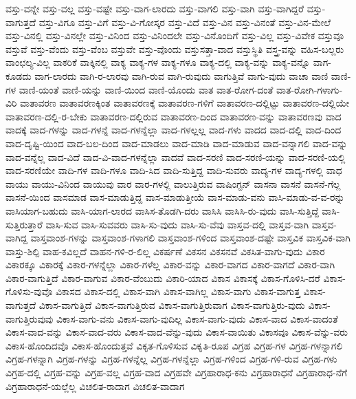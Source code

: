 {ವಸ್ತು-ವನ್ನೇ
ವಸ್ತು-ವಲ್ಲ
ವಸ್ತು-ವಷ್ಟೇ
ವಸ್ತು-ವಾಗ-ಲಾರದು
ವಸ್ತು-ವಾಗಲಿ
ವಸ್ತು-ವಾಗಿ
ವಸ್ತು-ವಾಗಿದ್ದರೆ
ವಸ್ತು-ವಾಗುತ್ತದೆ
ವಸ್ತು-ವಿಗೂ
ವಸ್ತು-ವಿಗೆ
ವಸ್ತು-ವಿ-ಗೋಸ್ಕರ
ವಸ್ತು-ವಿದೆ
ವಸ್ತು-ವಿನ
ವಸ್ತು-ವಿನಂತೆ
ವಸ್ತು-ವಿನ-ಮೇಲೆ
ವಸ್ತು-ವಿನಲ್ಲಿ
ವಸ್ತು-ವಿನಲ್ಲೇ
ವಸ್ತು-ವಿನಿಂದ
ವಸ್ತು-ವಿನಿಂದಲೇ
ವಸ್ತು-ವಿನೊಂದಿಗೆ
ವಸ್ತು-ವಿಲ್ಲ
ವಸ್ತು-ವಿವೇಕ
ವಸ್ತುವೂ
ವಸ್ತುವೆ
ವಸ್ತು-ವೆಂದು
ವಸ್ತು-ವೆಂಬ
ವಸ್ತುವೇ
ವಸ್ತು-ವೊಂದು
ವಸ್ತುಸತ್ತಾ-ವಾದ
ವಸ್ತುಸ್ಥಿತಿ
ವಸ್ತ್ರ-ವನ್ನು
ವಹಿಸ-ಬಲ್ಲರು
ವಾಂಛಲ್ಯ-ವಿಲ್ಲ
ವಾಕರಿಕೆ
ವಾಕ್ಕಿನಲ್ಲಿ
ವಾಕ್ಯ
ವಾಕ್ಯ-ಗಳ
ವಾಕ್ಯ-ಗಳೂ
ವಾಕ್ಯ-ದಲ್ಲಿ
ವಾಕ್ಯ-ವನ್ನು
ವಾಕ್ಯ-ವನ್ನೊ
ವಾಗ-ಕೂಡದು
ವಾಗ-ಲಾರದು
ವಾಗಿ-ರ-ಲಾರವು
ವಾಗಿ-ರುವ
ವಾಗಿ-ರುವುದು
ವಾಗುತ್ತಿವೆ
ವಾಗು-ವುದು
ವಾಚಾ
ವಾಣಿ
ವಾಣಿ-ಗಳ
ವಾಣಿ-ಯಂತೆ
ವಾಣಿ-ಯನ್ನು
ವಾಣಿ-ಯಿಂದ
ವಾಣಿ-ಯೊಂದು
ವಾತ
ವಾತ-ರೋಗ-ದಂತೆ
ವಾತ-ರೋಗಿ-ಗಳಾಗು-ವಿರಿ
ವಾತಾವರಣ
ವಾತಾವರಣಕ್ಕಿಂತ
ವಾತಾವರಣಕ್ಕೆ
ವಾತಾವರಣ-ಗಳಿಗೆ
ವಾತಾವರಣ-ದಲ್ಲಿಟ್ಟು
ವಾತಾವರಣ-ದಲ್ಲಿಯೇ
ವಾತಾವರಣ-ದಲ್ಲಿ-ರ-ಬೇಕು
ವಾತಾವರಣ-ದಲ್ಲಿರುವ
ವಾತಾವರಣ-ದಿಂದ
ವಾತಾವರಣ-ವನ್ನು
ವಾತಾವರಣವು
ವಾದ
ವಾದಕ್ಕೆ
ವಾದ-ಗಳನ್ನು
ವಾದ-ಗಳನ್ನೆ
ವಾದ-ಗಳನ್ನೆಲ್ಲಾ
ವಾದ-ಗಳಲ್ಲಲ್ಲ
ವಾದ-ಗಳು
ವಾದದ
ವಾದ-ದಲ್ಲಿ
ವಾದ-ದಿಂದ
ವಾದ-ದೃಷ್ಟಿ-ಯಿಂದ
ವಾದ-ಬಲ-ದಿಂದ
ವಾದ-ಮಾಡಲು
ವಾದ-ಮಾಡಿ
ವಾದ-ಮಾಡುವ
ವಾದ-ವನ್ನಾಗಲಿ
ವಾದ-ವನ್ನು
ವಾದ-ವನ್ನೆಲ್ಲ
ವಾದ-ವಿದೆ
ವಾದ-ವಿ-ವಾದ-ಗಳನ್ನೆಲ್ಲಾ
ವಾದವೆ
ವಾದ-ಸರಣಿ
ವಾದ-ಸರಣಿ-ಯನ್ನು
ವಾದ-ಸರಣಿ-ಯಲ್ಲಿ
ವಾದ-ಸರಣಿಯೇ
ವಾದಿ-ಗಳ
ವಾದಿ-ಗಳೂ
ವಾದಿ-ಸಿದ
ವಾದಿ-ಸುತ್ತಿದ್ದ
ವಾದಿ-ಸುವರು
ವಾದ್ಯ-ಗಳ
ವಾದ್ಯ-ಗಳಲ್ಲಿ
ವಾಧ
ವಾಯು
ವಾಯು-ವಿನಿಂದ
ವಾಯುವು
ವಾರ
ವಾರ-ಗಳಲ್ಲಿ
ವಾಲುತ್ತಿರುವ
ವಾಷಿಂಗ್ಟನ್
ವಾಸನಾ
ವಾಸನೆ
ವಾಸನೆ-ಗೆಲ್ಲ
ವಾಸನೆ-ಯಿಂದ
ವಾಸಮಾಡ
ವಾಸ-ಮಾಡುತ್ತಿದ್ದ
ವಾಸ-ಮಾಡುತ್ತೀಯೆ
ವಾಸ-ಮಾಡು-ವನು
ವಾಸಿ-ಮಾಡು-ವ-ವ-ರನ್ನು
ವಾಸಿಯಾಗ-ಬಹುದು
ವಾಸಿ-ಯಾಗ-ಲಾರದ
ವಾಸಿಸ-ತೊಡಗಿ-ದರು
ವಾಸಿಸಿ
ವಾಸಿಸಿ-ರು-ವುದು
ವಾಸಿ-ಸುತ್ತಿದ್ದೆ
ವಾಸಿ-ಸುತ್ತಿರುತ್ತಾರೆ
ವಾಸಿ-ಸುವ
ವಾಸಿ-ಸುವವರು
ವಾಸಿ-ಸು-ವುದು
ವಾಸಿ-ಸು-ವೆವು
ವಾಸ್ತವ-ದಲ್ಲಿ
ವಾಸ್ತವ-ವಾಗಿ
ವಾಸ್ತವ-ವಾಗಿದ್ದ
ವಾಸ್ತವಾಂಶ-ಗಳನ್ನು
ವಾಸ್ತವಾಂಶ-ಗಳಾಗಲಿ
ವಾಸ್ತವಾಂಶ-ಗಳಿಂದ
ವಾಸ್ತವಾಂಶ-ದಷ್ಟೇ
ವಾಸ್ತವಿಕ
ವಾಸ್ತವಿಕ-ವಾಗಿ
ವಾಸ್ತು-ಶಿಲ್ಪಿ
ವಾಹ-ಕವಿಲ್ಲದೆ
ವಾಹನ-ಗಳಿ-ರ-ಲಿಲ್ಲ
ವಿಕರ್ಷಣೆ
ವಿಕಸನ
ವಿಕಸನವೆ
ವಿಕಸಿತ-ವಾಗು-ವುದು
ವಿಕಾರ
ವಿಕಾರಕ್ಕೂ
ವಿಕಾರಕ್ಕೆ
ವಿಕಾರ-ಗಳನ್ನೆಲ್ಲಾ
ವಿಕಾರ-ಗಳೆಲ್ಲ
ವಿಕಾರ-ವನ್ನು
ವಿಕಾರ-ವಾಗದ
ವಿಕಾರ-ವಾಗದೆ
ವಿಕಾರ-ವಾಗಿ
ವಿಕಾರ-ವಾಗುತ್ತಿದೆ
ವಿಕಾರ-ವಾಗುವ
ವಿಕಾರ-ವೆಂಬುದು
ವಿಕಾರಿ-ಯಾದ
ವಿಕಾಸ
ವಿಕಾಸಕ್ಕೆ
ವಿಕಾಸ-ಗೊಳಿಸಿ-ದರೆ
ವಿಕಾಸ-ಗೊಳಿಸು-ವುವೊ
ವಿಕಾಸದ
ವಿಕಾಸ-ದಲ್ಲಿ
ವಿಕಾಸ-ವಾಗಿ
ವಿಕಾಸ-ವಾಗಿಲ್ಲ
ವಿಕಾಸ-ವಾಗು
ವಿಕಾಸ-ವಾಗುತ್ತ
ವಿಕಾಸ-ವಾಗುತ್ತದೆ
ವಿಕಾಸ-ವಾಗುತ್ತಿದೆ
ವಿಕಾಸ-ವಾಗುತ್ತಿರುವ
ವಿಕಾಸ-ವಾಗುತ್ತಿರುವಾಗ
ವಿಕಾಸ-ವಾಗುತ್ತಿರು-ವುದು
ವಿಕಾಸ-ವಾಗುತ್ತಿರುವುವು
ವಿಕಾಸ-ವಾಗು-ವನು
ವಿಕಾಸ-ವಾಗು-ವುದಿಲ್ಲ
ವಿಕಾಸ-ವಾಗು-ವುದು
ವಿಕಾಸ-ವಾದ
ವಿಕಾಸ-ವಾದಂತೆ
ವಿಕಾಸ-ವಾದ-ವನ್ನು
ವಿಕಾಸ-ವಾದ-ವರು
ವಿಕಾಸ-ವಾದ-ವೆನ್ನು-ವುದು
ವಿಕಾಸ-ವಾಯಿತು
ವಿಕಾಸವೂ
ವಿಕಾಸ-ವೆನ್ನು-ವರು
ವಿಕಾಸ-ಹೊಂದಿದವೊ
ವಿಕಾಸ-ಹೊಂದುತ್ತವೆ
ವಿಕೃತ-ಗೊಳಿಸುವ
ವಿಕೃತಿ-ರೂಪ
ವಿಗ್ರಹ
ವಿಗ್ರಹ-ಗಳ
ವಿಗ್ರಹ-ಗಳನ್ನಾಗಲಿ
ವಿಗ್ರಹ-ಗಳನ್ನಾಗಿ
ವಿಗ್ರಹ-ಗಳನ್ನು
ವಿಗ್ರಹ-ಗಳನ್ನೆಲ್ಲ
ವಿಗ್ರಹ-ಗಳನ್ನೆಲ್ಲಾ
ವಿಗ್ರಹ-ಗಳಿಂದ
ವಿಗ್ರಹ-ಗಳಿ-ರುವ
ವಿಗ್ರಹ-ಗಳು
ವಿಗ್ರಹ-ದಲ್ಲಿ
ವಿಗ್ರಹ-ವನ್ನು
ವಿಗ್ರಹ-ವಲ್ಲ
ವಿಗ್ರಹ-ವಾದ
ವಿಗ್ರಹವೇ
ವಿಗ್ರಹಾರಾಧ-ಕನು
ವಿಗ್ರಹಾರಾಧನೆ
ವಿಗ್ರಹಾರಾಧ-ನೆಗೆ
ವಿಗ್ರಹಾರಾಧನೆ-ಯಲ್ಲೆಲ್ಲ
ವಿಚಲಿತ-ರಾದಾಗ
ವಿಚಲಿತ-ವಾದಾಗ
}
